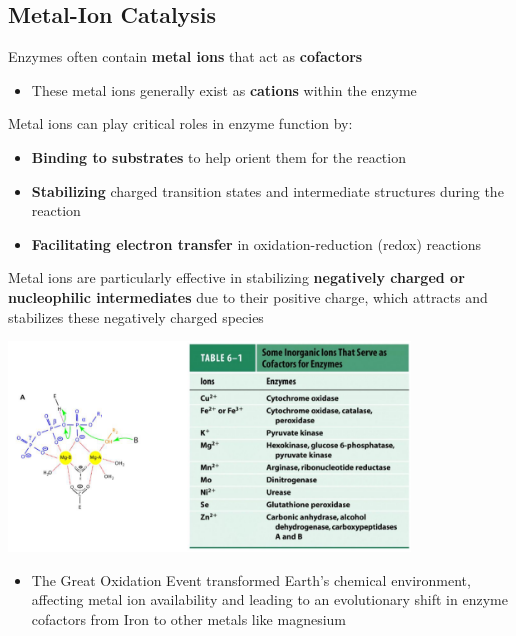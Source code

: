 \documentclass[10pt]{article}
\begin{document}
\subsection*{Metal-Ion Catalysis}
Enzymes often contain \textbf{metal ions} that act as \textbf{cofactors}
\begin{itemize}
    \item These metal ions generally exist as \textbf{cations} within the enzyme
\end{itemize}
Metal ions can play critical roles in enzyme function by:
\begin{itemize}
    \item \textbf{Binding to substrates} to help orient them for the reaction
    \item \textbf{Stabilizing} charged transition states and intermediate structures during the reaction
    \item \textbf{Facilitating electron transfer} in oxidation-reduction (redox) reactions
\end{itemize}
Metal ions are particularly effective in stabilizing \textbf{negatively charged or nucleophilic intermediates} due to their positive charge, which attracts and stabilizes these negatively charged species
\begin{center}
    \includegraphics*[width=0.8\textwidth]{L2_17.png} 
\end{center}
\begin{itemize}
    \item The Great Oxidation Event transformed Earth's chemical environment, affecting metal ion availability and leading to an evolutionary shift in enzyme cofactors from Iron to other metals like magnesium
\end{itemize}
\end{document}
